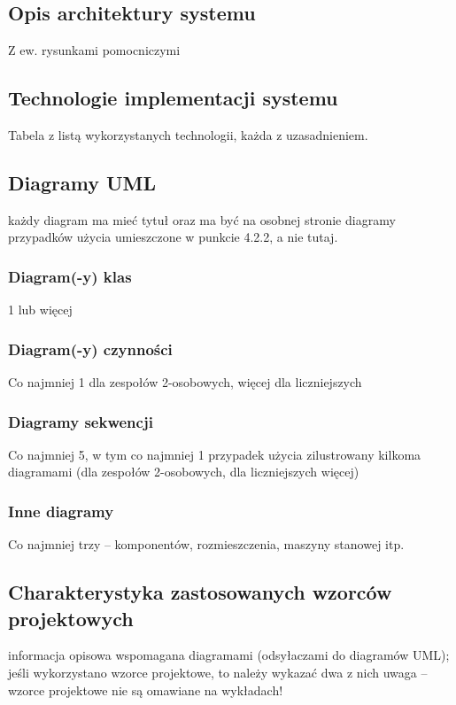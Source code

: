 \documentclass[a4paper,12pt]{article}
\begin{document}
\subsection{Opis architektury systemu}
Z ew. rysunkami pomocniczymi

\subsection{Technologie implementacji systemu}

Tabela z listą wykorzystanych technologii, każda z uzasadnieniem.

\subsection{Diagramy UML}

każdy diagram ma mieć tytuł oraz ma być na osobnej stronie
diagramy przypadków użycia umieszczone w punkcie 4.2.2, a nie tutaj.

\subsubsection{Diagram(-y) klas}
1 lub więcej

\subsubsection{Diagram(-y) czynności}
Co najmniej 1 dla zespołów 2-osobowych, więcej dla liczniejszych

\subsubsection{Diagramy sekwencji}
Co najmniej 5, w tym co najmniej 1 przypadek użycia zilustrowany kilkoma diagramami (dla zespołów 2-osobowych, dla liczniejszych więcej)

\subsubsection{Inne diagramy}
Co najmniej trzy – komponentów, rozmieszczenia, maszyny stanowej itp.

\subsection{Charakterystyka zastosowanych wzorców projektowych}

informacja opisowa wspomagana diagramami (odsyłaczami do diagramów UML); jeśli wykorzystano wzorce projektowe, to należy wykazać dwa z nich
uwaga – wzorce projektowe nie są omawiane na wykładach!
\end{document}

